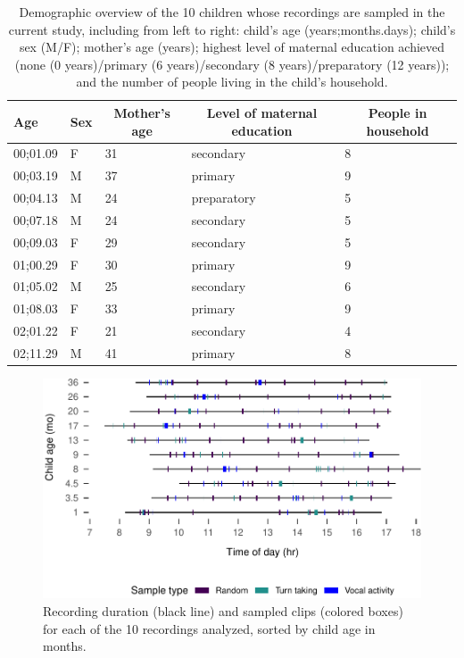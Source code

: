 \documentclass[,man,floatsintext]{apa6}
\begin{document}
\begin{table}[tbp]
\begin{center}
\begin{threeparttable}
\caption{\label{tab:tab1}Demographic overview of the 10 children whose recordings are sampled in the current study, including from left to right: child's age (years;months.days); child's sex (M/F); mother's age (years); highest level of maternal education achieved (none (0 years)/primary (6 years)/secondary (8 years)/preparatory (12 years)); and the number of people living in the child's household.}
\begin{tabular}{lllll}
\toprule
Age & \multicolumn{1}{c}{Sex} & \multicolumn{1}{c}{Mother's age} & \multicolumn{1}{c}{Level of maternal education} & \multicolumn{1}{c}{People in household}\\
\midrule
00;01.09 & F & 31 & secondary & 8\\
00;03.19 & M & 37 & primary & 9\\
00;04.13 & M & 24 & preparatory & 5\\
00;07.18 & M & 24 & secondary & 5\\
00;09.03 & F & 29 & secondary & 5\\
01;00.29 & F & 30 & primary & 9\\
01;05.02 & M & 25 & secondary & 6\\
01;08.03 & F & 33 & primary & 9\\
02;01.22 & F & 21 & secondary & 4\\
02;11.29 & M & 41 & primary & 8\\
\bottomrule
\end{tabular}
\end{threeparttable}
\end{center}
\end{table}

\begin{figure}
\centering
\includegraphics{Yeli-CLE_files/figure-latex/fig1-1.pdf}
\caption{\label{fig:fig1}Recording duration (black line) and sampled clips
(colored boxes) for each of the 10 recordings analyzed, sorted by child
age in months.}
\end{figure}
\end{document}
